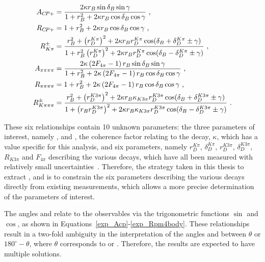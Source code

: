 \begin{align}
A_{{C\!P}+} &= \frac{2 \kappa r_B\sin\delta_B\sin\gamma}{1 + r_B^2 + 2 \kappa r_B\cos\delta_B\cos\gamma} \text{ ,}
\label{exp_Acp} \\
R_{{C\!P}+} &= 1 + r_B^2 + 2 \kappa r_B\cos\delta_B\cos\gamma \text{ ,}
\label{exp_Rcp} \\
R^{\pm}_{K\pi} &= \frac{r_B^2 + \left(r_D^{K\pi}\right)^2 + 2\kappa r_B r_D^{K\pi} \cos(\delta_B + \delta_D^{K\pi} \pm \gamma)}{1 + r_B^2\left(r_D^{K\pi}\right)^2 + 2\kappa r_B r_D^{K\pi} \cos(\delta_B - \delta_D^{K\pi} \pm \gamma)} \text{ ,}
\label{exp_Rpm} \\
A_{\pi\pi\pi\pi} &= \frac{2 \kappa\left(2F_{4\pi} - 1\right) r_B\sin\delta_B\sin\gamma}{1 + r_B^2 + 2 \kappa\left(2F_{4\pi} - 1\right) r_B\cos\delta_B\cos\gamma} \text{ ,}
\label{exp_A4pi} \\
R_{\pi\pi\pi\pi} &= 1 + r_B^2 + 2 \kappa\left(2F_{4\pi} - 1\right) r_B\cos\delta_B\cos\gamma \text{ ,}
\label{exp_R4pi} \\
R^{\pm}_{K\pi\pi\pi} &= \frac{r_B^2 + \left(r_D^{K3\pi}\right)^2 + 2\kappa r_B \kappa_{K3\pi} r_D^{K3\pi} \cos(\delta_B + \delta_D^{K3\pi} \pm \gamma)}{1 + \left(r_Br_D^{K3\pi}\right)^2 + 2\kappa r_B \kappa_{K3\pi} r_D^{K3\pi} \cos(\delta_B - \delta_D^{K3\pi} \pm \gamma)} \text{ .}
\label{exp_Rpm4body}
\end{align}

These six relationships contain 10 unknown parameters: the three parameters of interest, namely \rb, \deltab and \Pgamma, the coherence factor relating to the \Bm decay, $\kappa$, which has a value specific for this analysis, and six parameters, namely $r_D^{K\pi}$, $\delta_D^{K\pi}$, $r_D^{K3\pi}$, $\delta_D^{K3\pi}$, $R_{K3\pi}$ and $F_{4\pi}$ describing the various \Dz decays, which have all been measured with relatively small uncertainties~\cite{charm4pi,charmk3pi,charmk3pi_errata,LHCb-PAPER-2015-057}. Therefore, the strategy taken in this thesis to extract \rb, \deltab and \Pgamma is to constrain the six parameters describing the various \Dz decays directly from existing measurements, which allows a more precise determination of the parameters of interest.

The angles \rb and \Pgamma relate to the \CP observables via the trigonometric functions $\sin$ and $\cos$, as shown in Equations~\ref{exp_Acp}-\ref{exp_Rpm4body}. These relationships result in a two-fold ambiguity in the interpretation of the angles \deltab and \Pgamma between $\theta$ or $180^{\circ} - \theta$, where $\theta$ corresponds to \deltab or \Pgamma. Therefore, the results are expected to have multiple solutions.


